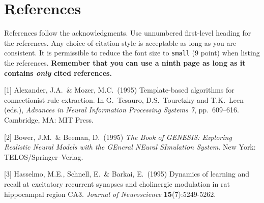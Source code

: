 \documentclass{article}
\begin{document}
\iffalse
{\small{
\begin{thebibliography}{15}

\bibitem{Szeliski}
Szeliski, Richard. \textit{Computer Vision: Algorithms and Applications}. 1st ed. London: Springer-Verlag, 2010. Print.

\bibitem{middlebury} 
Temple dataset \url{http://vision.middlebury.edu/mview/data/}

      \bibitem{akaze} P. Alcantarilla, J. Nuevo and A. Bartoli, \textit{Fast Explicit Diffusion for Accelerated Features in Nonlinear Scale Spaces}, BMVC 2013
      \bibitem{threepoint} F. Fraundorfer, P. Tanskanen and M. Pollefeys \textit{A minimal case solution to the calibrated relative pose problem for the case of two known orientation angles}, ECCV 2010.
       \bibitem{vo} D. Nister, O. Naroditsky and J. Bergen \textit{Visual Odometry}, CVPR 2004
       
       \bibitem{homography} O. D. Faugeras and F. Lustman, \textit{Motion and structure from motion in a piecewise planar environment}, IJPRAI, 1988

       \bibitem{semidense} T. Schops, J. Engel and D. Cremers \textit{Semi-Dense visual odometry for AR on a smartphone}
      \bibitem{tumsensor} P. Tiefenbacher, T. Schulze and G. Rigoll \textit{Off-the-shelf sensor integration for mono-SLAM on Smart Devices}, CVPR 2015
}
\fi


\section*{References}

References follow the acknowledgments. Use unnumbered first-level
heading for the references. Any choice of citation style is acceptable
as long as you are consistent. It is permissible to reduce the font
size to \verb+small+ (9 point) when listing the references. {\bf
  Remember that you can use a ninth page as long as it contains
  \emph{only} cited references.}
\medskip

\small

[1] Alexander, J.A.\ \& Mozer, M.C.\ (1995) Template-based algorithms
for connectionist rule extraction. In G.\ Tesauro, D.S.\ Touretzky and
T.K.\ Leen (eds.), {\it Advances in Neural Information Processing
  Systems 7}, pp.\ 609--616. Cambridge, MA: MIT Press.

[2] Bower, J.M.\ \& Beeman, D.\ (1995) {\it The Book of GENESIS:
  Exploring Realistic Neural Models with the GEneral NEural SImulation
  System.}  New York: TELOS/Springer--Verlag.

[3] Hasselmo, M.E., Schnell, E.\ \& Barkai, E.\ (1995) Dynamics of
learning and recall at excitatory recurrent synapses and cholinergic
modulation in rat hippocampal region CA3. {\it Journal of
  Neuroscience} {\bf 15}(7):5249-5262.
\end{document}
